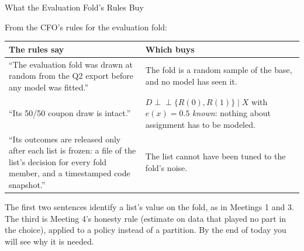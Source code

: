 \documentclass[aspectratio=169, 11pt, handout]{beamer}
\newcommand{\indep}{\perp\!\!\!\perp}
\begin{document}
\begin{frame}{What the Evaluation Fold's Rules Buy}

From the CFO's rules for the evaluation fold:

\begin{center}
\small
\begin{tabular}{p{6.4cm}p{6.6cm}}
\toprule
\textbf{The rules say} & \textbf{Which buys} \\
\midrule
``The evaluation fold was drawn at random from the Q2 export before any model was fitted.'' & The fold is a random sample of the base, and no model has seen it. \\[0.4em]
``Its 50/50 coupon draw is intact.'' & $D \indep \{R(0), R(1)\} \mid X$ with $e(x) = 0.5$ \emph{known}: nothing about assignment has to be modeled. \\[0.4em]
``Its outcomes are released only after each list is frozen: a file of the list's decision for every fold member, and a timestamped code snapshot.'' & The list cannot have been tuned to the fold's noise. \\
\bottomrule
\end{tabular}
\end{center}

\medskip

The first two sentences identify a list's value on the fold, as in Meetings 1 and 3. The third is Meeting 4's honesty rule (estimate on data that played no part in the choice), applied to a policy instead of a partition. By the end of today you will see why it is needed.
\end{frame}
\end{document}

